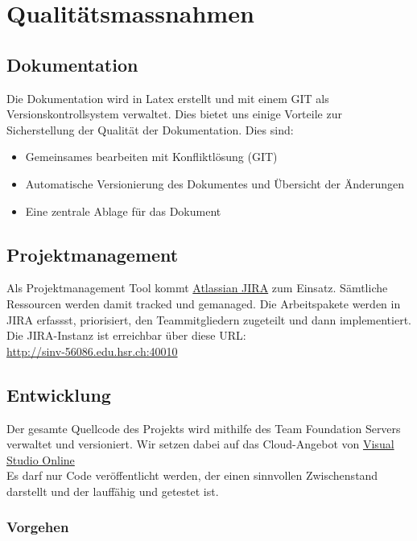 \chapter{Qualitätsmassnahmen}

\section{Dokumentation}
Die Dokumentation wird in Latex erstellt und mit einem GIT als Versionskontrollsystem verwaltet. Dies bietet uns einige Vorteile zur Sicherstellung der Qualität der Dokumentation. Dies sind:
\\\begin{itemize}
    \item Gemeinsames bearbeiten mit Konfliktlösung (GIT)
    \item Automatische Versionierung des Dokumentes und Übersicht der Änderungen
    \item Eine zentrale Ablage für das Dokument
\end{itemize}


\section{Projektmanagement}
Als Projektmanagement Tool kommt \href{https://www.atlassian.com/software/jira/agile}{Atlassian JIRA} zum Einsatz. Sämtliche Ressourcen werden damit 
tracked und gemanaged. Die Arbeitspakete werden in JIRA erfassst, priorisiert, den Teammitgliedern zugeteilt und dann implementiert. 
Die JIRA-Instanz ist erreichbar über diese URL: 
\\\url{http://sinv-56086.edu.hsr.ch:40010}

\section{Entwicklung}
Der gesamte Quellcode des Projekts wird mithilfe des Team Foundation Servers verwaltet und versioniert. Wir setzen dabei auf das Cloud-Angebot von \href{http://www.visualstudio.com/}{Visual Studio Online} 
\\Es darf nur Code veröffentlicht werden, der einen sinnvollen Zwischenstand darstellt und der lauffähig und getestet ist.
\subsection{Vorgehen}

